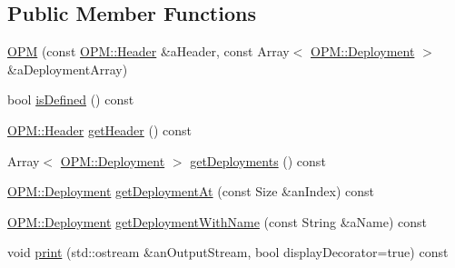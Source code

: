 \subsection*{Public Member Functions}
\begin{DoxyCompactItemize}
\item 
\hyperlink{classostk_1_1astro_1_1trajectory_1_1orbit_1_1messages_1_1spacex_1_1_o_p_m_a2c7d8dad60a7cabf0a3a24bae0972a89}{O\+PM} (const \hyperlink{structostk_1_1astro_1_1trajectory_1_1orbit_1_1messages_1_1spacex_1_1_o_p_m_1_1_header}{O\+P\+M\+::\+Header} \&a\+Header, const Array$<$ \hyperlink{structostk_1_1astro_1_1trajectory_1_1orbit_1_1messages_1_1spacex_1_1_o_p_m_1_1_deployment}{O\+P\+M\+::\+Deployment} $>$ \&a\+Deployment\+Array)
\item 
bool \hyperlink{classostk_1_1astro_1_1trajectory_1_1orbit_1_1messages_1_1spacex_1_1_o_p_m_ac3351273b45e39ef7574a5cb9b7bf30d}{is\+Defined} () const
\item 
\hyperlink{structostk_1_1astro_1_1trajectory_1_1orbit_1_1messages_1_1spacex_1_1_o_p_m_1_1_header}{O\+P\+M\+::\+Header} \hyperlink{classostk_1_1astro_1_1trajectory_1_1orbit_1_1messages_1_1spacex_1_1_o_p_m_ae0474132f01725d4b6e1276e52b9eb21}{get\+Header} () const
\item 
Array$<$ \hyperlink{structostk_1_1astro_1_1trajectory_1_1orbit_1_1messages_1_1spacex_1_1_o_p_m_1_1_deployment}{O\+P\+M\+::\+Deployment} $>$ \hyperlink{classostk_1_1astro_1_1trajectory_1_1orbit_1_1messages_1_1spacex_1_1_o_p_m_a61911a7200fc4b6c6b82224b3f8f07b6}{get\+Deployments} () const
\item 
\hyperlink{structostk_1_1astro_1_1trajectory_1_1orbit_1_1messages_1_1spacex_1_1_o_p_m_1_1_deployment}{O\+P\+M\+::\+Deployment} \hyperlink{classostk_1_1astro_1_1trajectory_1_1orbit_1_1messages_1_1spacex_1_1_o_p_m_afd84bfdf32c53ace7815b20971beac92}{get\+Deployment\+At} (const Size \&an\+Index) const
\item 
\hyperlink{structostk_1_1astro_1_1trajectory_1_1orbit_1_1messages_1_1spacex_1_1_o_p_m_1_1_deployment}{O\+P\+M\+::\+Deployment} \hyperlink{classostk_1_1astro_1_1trajectory_1_1orbit_1_1messages_1_1spacex_1_1_o_p_m_a9bad05972b0877708a32775690fe0f1e}{get\+Deployment\+With\+Name} (const String \&a\+Name) const
\item 
void \hyperlink{classostk_1_1astro_1_1trajectory_1_1orbit_1_1messages_1_1spacex_1_1_o_p_m_ae87eca86b432e8abd8137df02c1f9085}{print} (std\+::ostream \&an\+Output\+Stream, bool display\+Decorator=true) const
\end{DoxyCompactItemize}
